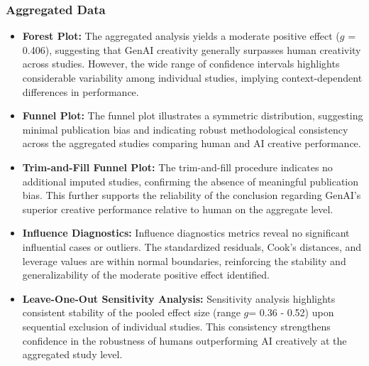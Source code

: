 \documentclass[manuscript, screen, review, acmsmall, anonymous]{acmart}
\begin{document}
\subsubsection{Aggregated Data}
\begin{itemize}
  \item \textbf{Forest Plot:} The aggregated analysis yields a moderate positive effect ($g$ = 0.406), suggesting that GenAI creativity generally surpasses human creativity across studies. However, the wide range of confidence intervals highlights considerable variability among individual studies, implying context-dependent differences in performance.
  \item \textbf{Funnel Plot:} The funnel plot illustrates a symmetric distribution, suggesting minimal publication bias and indicating robust methodological consistency across the aggregated studies comparing human and AI creative performance.
  \item \textbf{Trim-and-Fill Funnel Plot:} The trim-and-fill procedure indicates no additional imputed studies, confirming the absence of meaningful publication bias. This further supports the reliability of the conclusion regarding GenAI's superior creative performance relative to human on the aggregate level.
  \item \textbf{Influence Diagnostics:} Influence diagnostics metrics reveal no significant influential cases or outliers. The standardized residuals, Cook’s distances, and leverage values are within normal boundaries, reinforcing the stability and generalizability of the moderate positive effect identified.
  \item \textbf{Leave-One-Out Sensitivity Analysis:} Sensitivity analysis highlights consistent stability of the pooled effect size (range $g$= 0.36 - 0.52) upon sequential exclusion of individual studies. This consistency strengthens confidence in the robustness of humans outperforming AI creatively at the aggregated study level.
\end{itemize}
\end{document}
